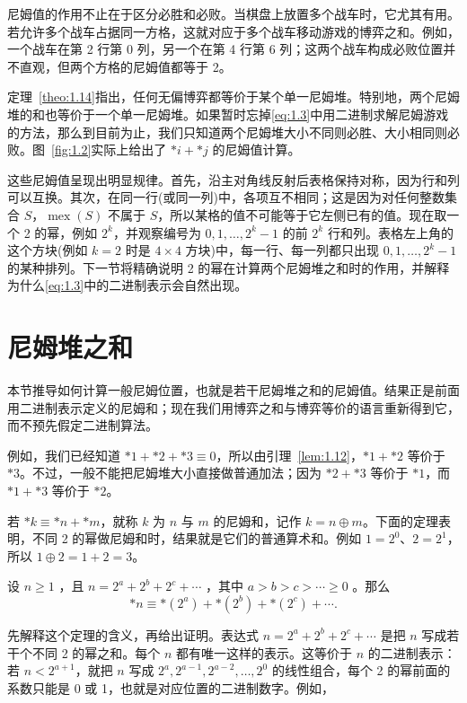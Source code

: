 尼姆值的作用不止在于区分必胜和必败。当棋盘上放置多个战车时，它尤其有用。若允许多个战车占据同一方格，这就对应于多个战车移动游戏的博弈之和。例如，一个战车在第 2 行第 0 列，另一个在第 4 行第 6 列；这两个战车构成必败位置并不直观，但两个方格的尼姆值都等于 2。

定理~\ref{theo:1.14}指出，任何无偏博弈都等价于某个单一尼姆堆。特别地，两个尼姆堆的和也等价于一个单一尼姆堆。如果暂时忘掉\eqref{eq:1.3}中用二进制求解尼姆游戏的方法，那么到目前为止，我们只知道两个尼姆堆大小不同则必胜、大小相同则必败。图~\ref{fig:1.2}实际上给出了 \(*i+*j\) 的尼姆值计算。

这些尼姆值呈现出明显规律。首先，沿主对角线反射后表格保持对称，因为行和列可以互换。其次，在同一行(或同一列)中，各项互不相同；这是因为对任何整数集合 \(S\)，\(\operatorname{mex}(S)\) 不属于 \(S\)，所以某格的值不可能等于它左侧已有的值。现在取一个 2 的幂，例如 \({2}^{k}\)，并观察编号为 \(0,1,\ldots,{2}^{k}-1\) 的前 \({2}^{k}\) 行和列。表格左上角的这个方块(例如 \(k=2\) 时是 \(4\times4\) 方块)中，每一行、每一列都只出现 \(0,1,\ldots,{2}^{k}-1\) 的某种排列。下一节将精确说明 2 的幂在计算两个尼姆堆之和时的作用，并解释为什么\eqref{eq:1.3}中的二进制表示会自然出现。

\section{尼姆堆之和}

本节推导如何计算一般尼姆位置，也就是若干尼姆堆之和的尼姆值。结果正是前面用二进制表示定义的尼姆和；现在我们用博弈之和与博弈等价的语言重新得到它，而不预先假定二进制算法。

例如，我们已经知道 \(*1+*2+*3\equiv 0\)，所以由引理~\ref{lem:1.12}，\(*1+*2\) 等价于 \(*3\)。不过，一般不能把尼姆堆大小直接做普通加法；因为 \(*2+*3\) 等价于 \(*1\)，而 \(*1+*3\) 等价于 \(*2\)。

若 \(*k\equiv *n+*m\)，就称 \(k\) 为 \(n\) 与 \(m\) 的尼姆和，记作 \(k=n\oplus m\)。下面的定理表明，不同 2 的幂做尼姆和时，结果就是它们的普通算术和。例如 \(1=2^{0}\)、\(2=2^{1}\)，所以 \(1\oplus2=1+2=3\)。

\begin{theorem}\label{theo:1.15}设 \(n \geq  1\) ，且 \(n = {2}^{a} + {2}^{b} + {2}^{c} + \cdots\) ，其中 \(a > b > c > \cdots  \geq  0\) 。那么
\begin{equation}
* n \equiv   * \left( {2}^{a}\right)  +  * \left( {2}^{b}\right)  +  * \left( {2}^{c}\right)  + \cdots .\label{eq:1.19}
\end{equation}
\end{theorem}
先解释这个定理的含义，再给出证明。表达式 \(n={2}^{a}+{2}^{b}+{2}^{c}+\cdots\) 是把 \(n\) 写成若干个不同 2 的幂之和。每个 \(n\) 都有唯一这样的表示。这等价于 \(n\) 的二进制表示：若 \(n<{2}^{a+1}\)，就把 \(n\) 写成 \({2}^{a},{2}^{a-1},{2}^{a-2},\ldots,{2}^{0}\) 的线性组合，每个 2 的幂前面的系数只能是 0 或 1，也就是对应位置的二进制数字。例如，

